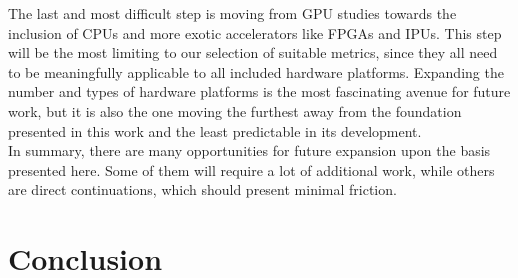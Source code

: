 The last and most difficult step is moving from GPU studies towards the inclusion of CPUs and more exotic accelerators like FPGAs and IPUs. This step will be the most limiting to our selection of suitable metrics, since they all need to be meaningfully applicable to all included hardware platforms. Expanding the number and types of hardware platforms is the most fascinating avenue for future work, but it is also the one moving the furthest away from the foundation presented in this work and the least predictable in its development. \\
In summary, there are many opportunities for future expansion upon the basis presented here. Some of them will require a lot of additional work, while others are direct continuations, which should present minimal friction.

\section{Conclusion}


